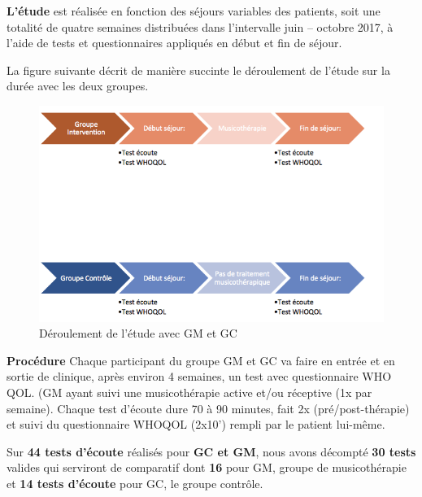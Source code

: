 \textbf{L'étude} est
réalisée en fonction des séjours variables des patients, soit une
totalité  de quatre semaines
distribuées dans l'intervalle juin --
octobre 2017,  à l'aide de tests et questionnaires appliqués en début
et fin de séjour.

La figure suivante décrit de manière succinte le déroulement de
l'étude sur la durée avec les deux groupes.



\begin{figure}[hb]
	\centering
	\includegraphics[width=1\linewidth]{images/Groupecontrole.png}
	\caption[Schéma du déroulement]{Déroulement de l'étude avec GM et GC}
	
\end{figure}


\textbf{Procédure}
Chaque participant du groupe GM et GC va faire en entrée et en sortie de
clinique, après environ 4 semaines, un
test avec questionnaire  WHO QOL. (GM ayant suivi une musicothérapie active et/ou réceptive (1x par
semaine).
Chaque test d'écoute dure
70 à 90 minutes, fait 2x (pré/post-thérapie) et
suivi du questionnaire WHOQOL (2x10') rempli par le
patient lui-même.

Sur \textbf{44 tests d'écoute} réalisés pour \textbf{GC et GM},
nous avons décompté\textbf{ 30 tests} valides qui serviront de
comparatif dont \textbf{16} pour
GM, groupe de musicothérapie et \textbf{14 tests d'écoute} pour GC, le groupe
contrôle.

